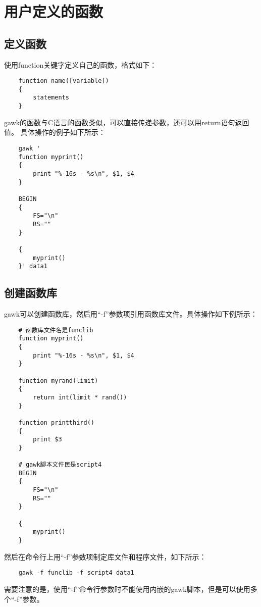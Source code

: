 \documentclass[a4paper,left=2.5cm,right=2.5cm,11pt]{article}
\begin{document}
\section{用户定义的函数}
\subsection{定义函数}
	使用function关键字定义自己的函数，格式如下：
	\begin{lstlisting}
	function name([variable])
	{
		statements
	}
	\end{lstlisting}

	gawk的函数与C语言的函数类似，可以直接传递参数，还可以用return语句返回值。
	具体操作的例子如下所示：
	\begin{lstlisting}
	gawk '
	function myprint()
	{
		print "%-16s - %s\n", $1, $4
	}

	BEGIN
	{
		FS="\n"
		RS=""
	}

	{
		myprint()
	}' data1
	\end{lstlisting}

\subsection{创建函数库}
	gawk可以创建函数库，然后用“-f”参数项引用函数库文件。具体操作如下例所示：
	\begin{lstlisting}
	# 函数库文件名是funclib
	function myprint()
	{
		print "%-16s - %s\n", $1, $4
	}

	function myrand(limit)
	{
		return int(limit * rand())
	}

	function printthird()
	{
		print $3
	}

	# gawk脚本文件民是script4
	BEGIN
	{
		FS="\n"
		RS=""
	}

	{
		myprint()
	}
	\end{lstlisting}

	然后在命令行上用“-f”参数项制定库文件和程序文件，如下所示：
	\begin{lstlisting}
	gawk -f funclib -f script4 data1
	\end{lstlisting}

	需要注意的是，使用“-f”命令行参数时不能使用内嵌的gawk脚本，但是可以使用多个“-f”参数。
\end{document}
